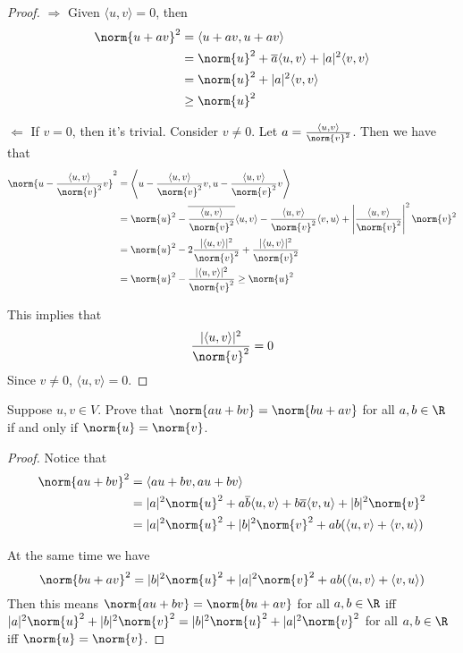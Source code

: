 \documentclass{extarticle}
\begin{document}
\begin{proof}
\(\Rightarrow\) Given \(\langle u,v \rangle = 0\), then 
\begin{align*}
    \norm{u + av}^2 
    &= \langle u + av, u + av \rangle \\ 
    &= \norm{u}^2 + \overline{a}\langle u,v \rangle + |a|^2 \langle v,v \rangle \\ 
    &= \norm{u}^2 + |a|^2 \langle v,v \rangle \\ 
    &\geq \norm{u}^2
\end{align*}

\(\Leftarrow\) If \(v = 0\), then it's trivial. Consider \(v \neq 0\). Let \(a = \frac{\langle u,v \rangle}{\norm{v}^2}\). 
Then we have that 
\begin{align*}
    \norm{u - \frac{\langle u,v \rangle}{\norm{v}^2}v}^2 
    &= \left\langle u - \frac{\langle u,v \rangle}{\norm{v}^2}v, u - \frac{\langle u,v \rangle}{\norm{v}^2}v \right\rangle \\ 
    &= \norm{u}^2 - \overline{\frac{\langle u,v \rangle}{\norm{v}^2}} \langle u, v \rangle 
    - \frac{\langle u,v \rangle}{\norm{v}^2} \langle v,u \rangle + 
    \left\lvert \frac{\langle u,v \rangle}{\norm{v}^2} \right\rvert^2 \norm{v}^2 \\ 
    &= \norm{u}^2 - 2\frac{|\langle u,v \rangle|^2}{\norm{v}^2} + \frac{|\langle u,v \rangle|^2}{\norm{v}^2} \\ 
    &= \norm{u}^2 - \frac{|\langle u,v \rangle|^2}{\norm{v}^2} \geq \norm{u}^2
\end{align*}

This implies that 
\[\frac{|\langle u,v \rangle|^2}{\norm{v}^2} = 0\]
Since \(v \neq 0\), \(\langle u,v \rangle = 0\).
\end{proof}

\begin{problem}{7}
    Suppose \(u, v \in V\). Prove that \(\norm{au + bv} = \norm{bu + av}\) for all  
    \(a, b \in \R\) if and only if \(\norm{u} = \norm{v}\). 
\end{problem}

\begin{proof}
Notice that 
\begin{align*}
    \norm{au + bv}^2 
    &= \langle au + bv, au+bv \rangle \\ 
    &= |a|^2 \norm{u}^2 + a\overline{b}\langle u,v \rangle 
    + b\overline{a}\langle v,u \rangle + |b|^2 \norm{v}^2  \\ 
    &=|a|^2 \norm{u}^2 + |b|^2 \norm{v}^2 + ab(\langle u,v \rangle + \langle v,u \rangle)
\end{align*}

At the same time we have 
\[\norm{bu + av}^2 = |b|^2 \norm{u}^2 + |a|^2 \norm{v}^2 + ab(\langle u,v \rangle + \langle v,u \rangle)\]
Then this means \(\norm{au + bv} = \norm{bu + av}\) for all  
\(a, b \in \R\) iff \(|a|^2 \norm{u}^2 + |b|^2 \norm{v}^2 = |b|^2 \norm{u}^2 + |a|^2 \norm{v}^2 \) 
for all \(a, b \in \R\) iff \(\norm{u} = \norm{v}\). 
\end{proof}
\end{document}

